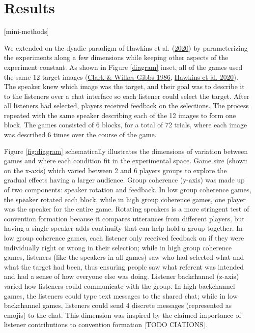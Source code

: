 \documentclass[
  english,
  a4paper,
]{article}
\begin{document}
\hypertarget{results}{%
\section{Results}\label{results}}

{[}mini-methods{]}

We extended on the dyadic paradigm of Hawkins et al. (\protect\hyperlink{ref-hawkinsCharacterizingDynamicsLearning2020}{2020}) by parameterizing the experiments along a few dimensions while keeping other aspects of the experiment constant. As shown in Figure \ref{diagram} inset, all of the games used the same 12 target images (\protect\hyperlink{ref-clarkReferringCollaborativeProcess1986}{Clark \& Wilkes-Gibbs 1986}, \protect\hyperlink{ref-hawkinsCharacterizingDynamicsLearning2020}{Hawkins et al. 2020}). The speaker knew which image was the target, and their goal was to describe it to the listeners over a chat interface so each listener could select the target. After all listeners had selected, players received feedback on the selections. The process repeated with the same speaker describing each of the 12 images to form one block. The games consisted of 6 blocks, for a total of 72 trials, where each image was described 6 times over the course of the game.

Figure \ref{fig:diagram} schematically illustrates the dimensions of variation between games and where each condition fit in the experimental space. Game size (shown on the x-axis) which varied between 2 and 6 players groups to explore the gradual effects having a larger audience. Group coherence (y-axis) was made up of two components: speaker rotation and feedback. In low group coherence games, the speaker rotated each block, while in high group coherence games, one player was the speaker for the entire game. Rotating speakers is a more stringent test of convention formation because it compares utterances from different players, but having a single speaker adds continuity that can help hold a group together. In low group coherence games, each listener only received feedback on if they were individually right or wrong in their selection; while in high group coherence games, listeners (like the speakers in all games) saw who had selected what and what the target had been, thus ensuring people saw what referent was intended and had a sense of how everyone else was doing. Listener backchannel (z-axis) varied how listeners could communicate with the group. In high backchannel games, the listeners could type text messages to the shared chat; while in low backchannel games, listeners could send 4 discrete messages (represented as emojis) to the chat. This dimension was inspired by the claimed importance of listener contributions to convention formation {[}TODO CIATIONS{]}.
\end{document}
